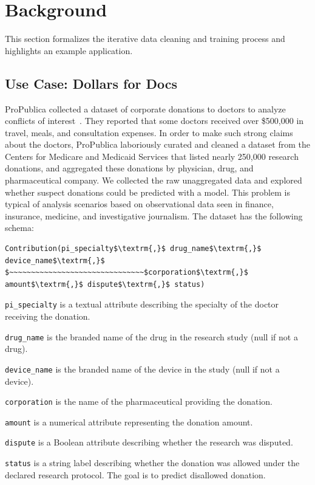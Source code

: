 \section{Background}\label{background}
This section formalizes the iterative data cleaning and training process and highlights an example application.

\subsection{Use Case: Dollars for Docs}\label{s:usecase}
ProPublica collected a dataset of corporate donations to doctors to analyze conflicts of interest~\cite{dollarsfordocsa}. 
They reported that some doctors received over \$500,000 in travel, meals, and consultation expenses.
In order to make such strong claims about the doctors, ProPublica laboriously curated and cleaned a dataset from the Centers for Medicare and Medicaid Services that listed nearly 250,000 research donations, and aggregated these donations by physician, drug, and pharmaceutical company.
We collected the raw unaggregated data and explored whether suspect donations could be predicted with a model.
This problem is typical of analysis scenarios based on observational data seen in finance, insurance, medicine, and investigative journalism.
The dataset has the following schema:
\begin{lstlisting}[mathescape,basicstyle={\small}]
Contribution(pi_specialty$\textrm{,}$ drug_name$\textrm{,}$ device_name$\textrm{,}$
$~~~~~~~~~~~~~~~~~~~~~~~~~~~~~~~$corporation$\textrm{,}$ amount$\textrm{,}$ dispute$\textrm{,}$ status)
\end{lstlisting}

\noindent\texttt{pi\_specialty} is a textual attribute describing the specialty of the doctor receiving the donation.

\noindent\texttt{drug\_name} is the branded name of the drug in the research study (null if not a drug).

\noindent\texttt{device\_name} is the branded name of the device in the study (null if not a device).

\noindent\texttt{corporation} is the name of the pharmaceutical providing the donation.

\noindent\texttt{amount} is a numerical attribute representing the donation amount.

\noindent\texttt{dispute} is a Boolean attribute describing whether the research was disputed.

\noindent\texttt{status} is a string label describing whether the  donation was allowed under the declared research protocol. The goal is to predict disallowed  donation. 

